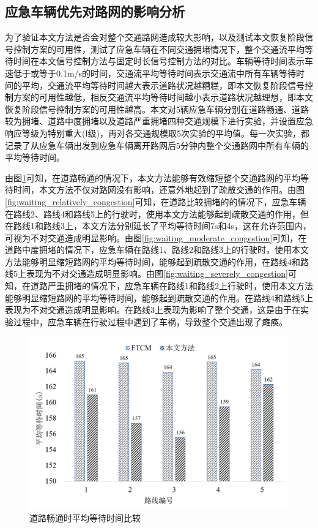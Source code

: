 \subsection{应急车辆优先对路网的影响分析}
为了验证本文方法是否会对整个交通路网造成较大影响，以及测试本文恢复阶段信号控制方案的可用性，测试了应急车辆在不同交通拥堵情况下，整个交通流平均等待时间在本文信号控制方法与固定时长信号控制方法的对比。车辆等待时间表示车速低于或等于0.1m/s的时间，交通流平均等待时间表示交通流中所有车辆等待时间的平均，交通流平均等待时间越大表示道路状况越糟糕，即本文恢复阶段信号控制方案的可用性越低，相反交通流平均等待时间越小表示道路状况越理想，即本文恢复阶段信号控制方案的可用性越高。本文对5辆应急车辆分别在道路畅通、道路较为拥堵、道路中度拥堵以及道路严重拥堵四种交通规模下进行实验，并设置应急响应等级为特别重大(Ⅰ级)，再对各交通规模取5次实验的平均值。每一次实验，都记录了从应急车辆出发到应急车辆离开路网后5分钟内整个交通路网中所有车辆的平均等待时间。

由图\ref{fig:waiting_smooth}可知，在道路畅通的情况下，本文方法能够有效缩短整个交通路网的平均等待时间，本文方法不仅对路网没有影响，还意外地起到了疏散交通的作用。由图\ref{fig:waiting_relatively_congestion}可知，在道路比较拥堵的的情况下，应急车辆在路线2、路线4和路线5上的行驶时，使用本文方法能够起到疏散交通的作用，但在路线1和路线3上，本文方法分别延长了平均等待时间7s和4s，这在允许范围内，可视为不对交通造成明显影响。由图\ref{fig:waiting_moderate_congestion}可知，在道路中度拥堵的情况下，应急车辆在路线1、路线2和路线3上的行驶时，使用本文方法能够明显缩短路网的平均等待时间，能够起到疏散交通的作用，在路线4和路线5上表现为不对交通造成明显影响。由图\ref{fig:waiting_severely_congestion}可知，在道路严重拥堵的情况下，应急车辆在路线1和路线2上行驶时，使用本文方法能够明显缩短路网的平均等待时间，能够起到疏散交通的作用。在路线4和路线5上表现为不对交通造成明显影响。在路线3上表现为影响了整个交通，这是由于在实验过程中，应急车辆在行驶过程中遇到了车祸，导致整个交通出现了瘫痪。

\begin{figure}[H]
	\centering
	\includegraphics[width=\linewidth]{figures/awt1.png}
	\caption{道路畅通时平均等待时间比较}
	\label{fig:waiting_smooth}
\end{figure}

